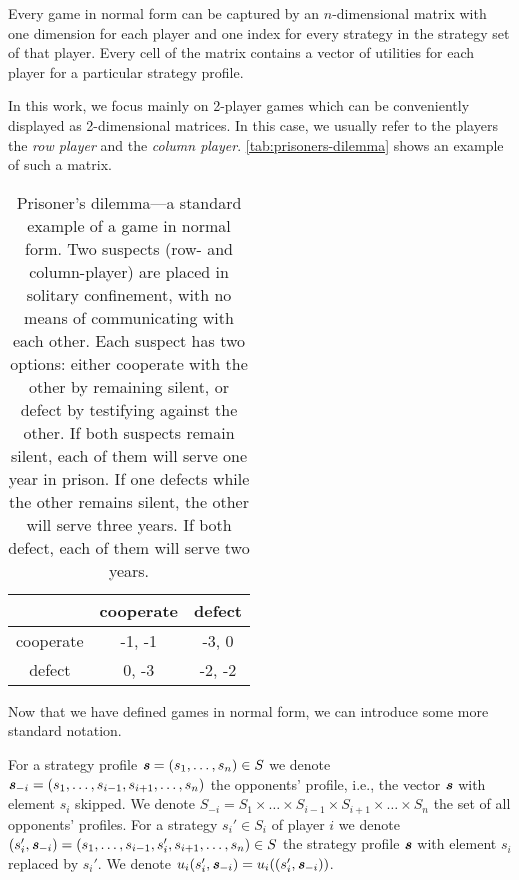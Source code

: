Every game in normal form can be captured by an $n$-dimensional matrix with one dimension for each player and one index for every strategy in the strategy set of that player.
Every cell of the matrix contains a vector of utilities for each player for a particular strategy profile.

In this work, we focus mainly on 2-player games which can be conveniently displayed as 2-dimensional matrices.
In this case, we usually refer to the players the \textit{row player} and the \textit{column player}.
\autoref{tab:prisoners-dilemma} shows an example of such a matrix.

\begin{table}
  \caption{Prisoner's dilemma---a standard example of a game in normal form.
  Two suspects (row- and column-player) are placed in solitary confinement, with no means of communicating with each other.
  Each suspect has two options: either cooperate with the other by remaining silent, or defect by testifying against the other.
  If both suspects remain silent, each of them will serve one year in prison.
  If one defects while the other remains silent, the other will serve three years.
  If both defect, each of them will serve two years.
  }
  \label{tab:prisoners-dilemma}
  \centering
  \begin{tabular}{|c|c|c|}
    \hline
              & cooperate & defect \\
    \hline
    cooperate & -1, -1    & -3, 0  \\
    \hline
    defect    & 0, -3     & -2, -2 \\
    \hline
  \end{tabular}
\end{table}

Now that we have defined games in normal form, we can introduce some more standard notation.

\begin{definition}
  For a strategy profile $\boldsymbol{\mathit{s}} = (s_1, \dots, s_n) \in S$ we denote $\boldsymbol{\mathit{s}}_{-i} = (s_1, \dots, s_{i-1}, s_{i+1}, \dots, s_n)$ the opponents' profile, i.e., the vector $\boldsymbol{\mathit{s}}$ with element $s_i$ skipped.
  We denote $S_{-i} = S_1 \times \dots \times S_{i-1} \times S_{i+1} \times \dots \times S_n$ the set of all opponents' profiles.
  For a strategy $s_i' \in S_i$ of player $i$ we denote $(s_i', \boldsymbol{\mathit{s}}_{-i}) = (s_1, \dots, s_{i-1}, s_i', s_{i+1}, \dots, s_n) \in S$ the strategy profile $\boldsymbol{\mathit{s}}$ with element $s_i$ replaced by $s_i'$.
  We denote  $u_i(s_i', \boldsymbol{\mathit{s}}_{-i}) = u_i((s_i', \boldsymbol{\mathit{s}}_{-i}))$.
\end{definition}

